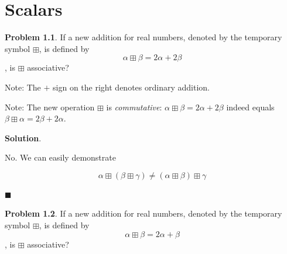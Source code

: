 \documentclass[english,notitlepage,smartquotes]{hgbreport}
\theoremstyle{definition}
\theoremstyle{definition}
\newtheorem{problem}{Problem}
\theoremstyle{remark}
\theoremstyle{definition}
\theoremstyle{plain}
\renewcommand\qedsymbol{$\blacksquare$}
\theoremstyle{definition}
\begin{document}
\begin{abstract}
\begin{itemize}
\item A roman letter in italics, like, for example, $p$, generally denotes a real number, unless specified otherwise (sometimes an integer). This is different from a number theory convention. 
\item Greek letters usually denote real numbers.
\item The so-called \verb|\cdot|: $\cdot$ to denote multiplication is sometimes omitted. Thus, $ab$ is equivalent (and often even preferred and ubiquitous, thanks to Euler!) to $a\cdot b$.

\end{itemize}
\end{abstract}

\tableofcontents
\chapter{Scalars}
\begin{problem}
\label{pr:2a2b}
If a new addition for real numbers, denoted by the temporary symbol $\boxplus$, is defined by
$$
\alpha\boxplus\beta=2\alpha+2\beta
$$
, is $\boxplus$ associative?

Note: The $+$ sign on the right denotes ordinary addition.

Note: The new operation $\boxplus$ is \textit{commutative}: $\alpha\boxplus\beta=2\alpha+2\beta$ indeed equals $\beta\boxplus\alpha=2\beta+2\alpha$.
\end{problem}

\textbf{Solution}.

No. We can easily demonstrate 

$$
\alpha\boxplus(\beta\boxplus\gamma)\ne(\alpha\boxplus\beta)\boxplus\gamma
$$


\qedsymbol

\begin{problem}
\label{pr:2ab}
If a new addition for real numbers, denoted by the temporary symbol $\boxplus$, is defined by
$$
\alpha\boxplus\beta=2\alpha+\beta
$$
, is $\boxplus$ associative?
\end{problem}
\end{document}
